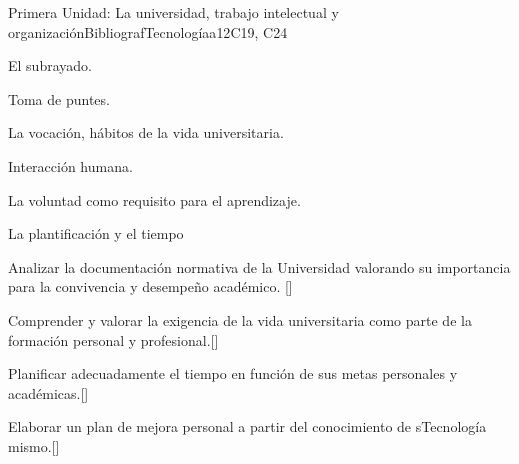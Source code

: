 \begin{syllabus}
\begin{unit}{}{Primera Unidad: La universidad, trabajo intelectual y organización}{BibliografTecnologíaa}{12}{C19, C24}
\begin{topics}
        \item El subrayado.
        \item Toma de puntes.
        \item La vocación, hábitos de la vida universitaria.
        \item Interacción humana.
        \item La voluntad como requisito para el aprendizaje.
        \item La plantificación y el tiempo
\end{topics}
\begin{learningoutcomes}
        \item Analizar la documentación normativa de la Universidad valorando su importancia para la  convivencia y desempeño académico. [\Usage]
        \item Comprender y valorar la exigencia de la vida universitaria como parte de la formación personal y profesional.[\Usage]
        \item Planificar adecuadamente el tiempo  en función de sus metas personales y académicas.[\Usage]
        \item Elaborar un plan de mejora personal a partir del conocimiento de sTecnología mismo.[\Usage]
\end{learningoutcomes}
\end{unit}


\end{syllabus}
